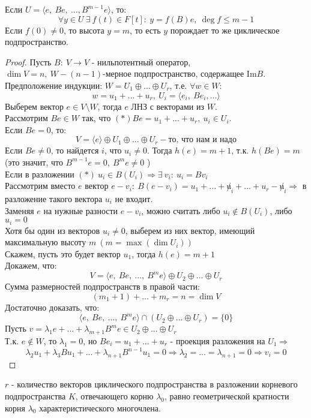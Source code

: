     \begin{lemma}
        Если $U = \langle e, \ Be,\ ...,B^{m-1}e \rangle$, то:
        $$\forall y \in U \ \exists \ f(t) \in F[t]: \ y = f(B)e, \ \deg f \leq m-1$$
        Если $f(0) \neq 0$, то высота $y = m$, то есть $y$ порождает то же циклическое подпространство.     
    \end{lemma}
    \begin{proof}
        Пусть $B: \ V \to V$ - нильпотентный оператор, \\ $\dim V = n, \ W - (n-1)$-мерное подпространство, содержащее $\text{Im}B$.\\ Предположение индукции: $W = U_1 \oplus ... \oplus U_r$, т.е. $\forall w \in W$:
        $$w = u_1+... +u_r, \ U_i = \langle e_i, \ Be_i,... \rangle$$
        Выберем вектор $e \in V\setminus W$, тогда $e$ ЛНЗ с векторами из $W$.\\
        Рассмотрим $Be \in W$ так, что $(*)Be = u_1 + ... + u_r, \ u_i \in U_i$. \\
        Если $Be = 0$, то:
        $$V = \langle e \rangle \oplus U_1 \oplus ... \oplus U_r - \text{то, что нам и надо}$$
        Если $Be \neq 0$, то найдется $i$, что $u_i \neq 0$. Тогда $h(e) = m+1$, т.к. $h(Be) = m$ \\
        (это значит, что $B^{m-1}e = 0, \ B^me \neq 0$ )\\
        Если в разложении $(*) \ u_i \in B(U_i) \Longrightarrow \exists \ v_i: \ u_i = Bv_i$\\
        Рассмотрим вместо $e$ вектор $e-v_i: \ B(e-v_i) = u_1 + ... + \not u_i+...+u_r - \not u_i \Longrightarrow $ в разложение такого вектора $u_i$ не входит.\\
        Заменяя $e$ на нужные разности $e-v_i$, можно считать либо $u_i \not \in B(U_i)$, либо $u_i = 0$  \\
        Хотя бы один из векторов $u_i \neq 0$, выберем из них вектор, имеющий максимальную высоту $m \ (m=\max (\dim U_i))$ \\
        Скажем, пусть это будет вектор $u_1$, тогда $h(e) = m+1$\\
        Докажем, что:
        $$V = \langle e, \ Be, \ ..., \ B^me \rangle \oplus U_2 \oplus ... \oplus U_r$$
        Сумма размерностей подпространств в правой части: 
        $$(m_1+1)+...+m_r = n = \dim V$$
        Достаточно доказать, что: 
        $$\langle e, \ Be, \ ..., \ B^me \rangle \cap (U_2 \oplus ... \oplus U_r) = \{0\}$$
        Пусть $v = \lambda_1 e +...+ \lambda_{m+1}B^me \in U_2 \oplus ... \oplus U_r$ \\
        Т.к. $e \not \in W$, то $\lambda_1 = 0$, но $Be_i = u_1+...+u_r$ - проекция разложения на $U_1 \Longrightarrow $ $$\lambda_2u_1+\lambda_3Bu_1+...+\lambda_{n+1}B^{n-1}u_1 = 0 \Longrightarrow \lambda_2=...=\lambda_{n+1} = 0 \Longrightarrow v_i = 0$$
    \end{proof} 
    \begin{remark}
        $r$ - количество векторов циклического подпространства в разложении корневого подпространства $K$, отвечающего корню $\lambda_0$, равно геометрической кратности корня $\lambda_0$ характеристического многочлена.    
    \end{remark}

